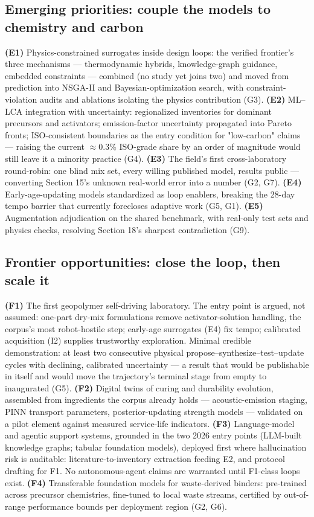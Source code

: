 \documentclass[pdflatex,sn-basic]{sn-jnl}
\begin{document}
\subsection{Emerging priorities: couple the models to chemistry and carbon}

\textbf{(E1)} Physics-constrained surrogates inside design loops: the verified frontier's three mechanisms --- thermodynamic hybrids, knowledge-graph guidance, embedded constraints --- combined (no study yet joins two) and moved from prediction into NSGA-II and Bayesian-optimization search, with constraint-violation audits and ablations isolating the physics contribution (G3). \textbf{(E2)} ML--LCA integration with uncertainty: regionalized inventories for dominant precursors and activators; emission-factor uncertainty propagated into Pareto fronts; ISO-consistent boundaries as the entry condition for "low-carbon" claims --- raising the current $\approx$0.3\% ISO-grade share by an order of magnitude would still leave it a minority practice (G4). \textbf{(E3)} The field's first cross-laboratory round-robin: one blind mix set, every willing published model, results public --- converting Section 15's unknown real-world error into a number (G2, G7). \textbf{(E4)} Early-age-updating models standardized as loop enablers, breaking the 28-day tempo barrier that currently forecloses adaptive work (G5, G1). \textbf{(E5)} Augmentation adjudication on the shared benchmark, with real-only test sets and physics checks, resolving Section 18's sharpest contradiction (G9).

\subsection{Frontier opportunities: close the loop, then scale it}

\textbf{(F1)} The first geopolymer self-driving laboratory. The entry point is argued, not assumed: one-part dry-mix formulations remove activator-solution handling, the corpus's most robot-hostile step; early-age surrogates (E4) fix tempo; calibrated acquisition (I2) supplies trustworthy exploration. Minimal credible demonstration: at least two consecutive physical propose--synthesize--test--update cycles with declining, calibrated uncertainty --- a result that would be publishable in itself and would move the trajectory's terminal stage from empty to inaugurated (G5). \textbf{(F2)} Digital twins of curing and durability evolution, assembled from ingredients the corpus already holds --- acoustic-emission staging, PINN transport parameters, posterior-updating strength models --- validated on a pilot element against measured service-life indicators. \textbf{(F3)} Language-model and agentic support systems, grounded in the two 2026 entry points (LLM-built knowledge graphs; tabular foundation models), deployed first where hallucination risk is auditable: literature-to-inventory extraction feeding E2, and protocol drafting for F1. No autonomous-agent claims are warranted until F1-class loops exist. \textbf{(F4)} Transferable foundation models for waste-derived binders: pre-trained across precursor chemistries, fine-tuned to local waste streams, certified by out-of-range performance bounds per deployment region (G2, G6).
\end{document}
